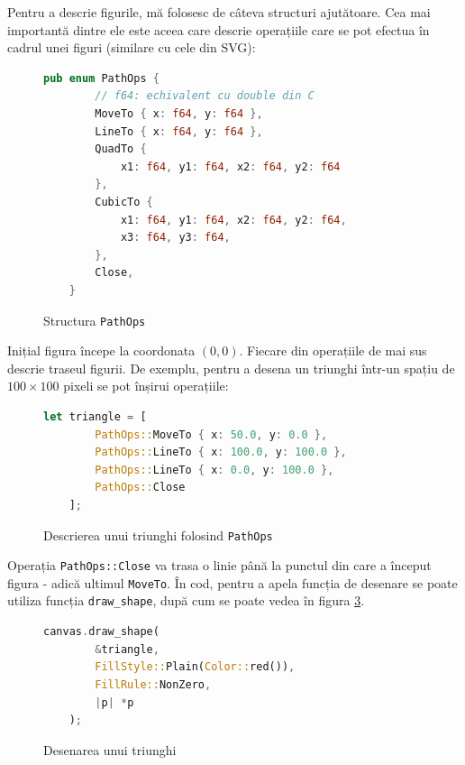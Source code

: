 \documentclass[a4paper, 12pt]{report}
\begin{document}
Pentru a descrie figurile, mă folosesc de câteva structuri ajutătoare. Cea mai importantă dintre ele este aceea care descrie
operațiile care se pot efectua în cadrul unei figuri (similare cu cele din SVG):

\begin{figure}[ht]
    \centering
    \begin{lstlisting}[language=Rust]
    pub enum PathOps {
        // f64: echivalent cu double din C
        MoveTo { x: f64, y: f64 },
        LineTo { x: f64, y: f64 },
        QuadTo {
            x1: f64, y1: f64, x2: f64, y2: f64
        },
        CubicTo {
            x1: f64, y1: f64, x2: f64, y2: f64,
            x3: f64, y3: f64,
        },
        Close,
    }
    \end{lstlisting}
    \caption{Structura \texttt{PathOps}}
    \label{fig-enum-pathops}
\end{figure}

Inițial figura începe la coordonata \((0, 0)\). Fiecare din operațiile de mai sus descrie traseul figurii. De exemplu, pentru a desena
un triunghi într-un spațiu de \(100 \times 100\) pixeli se pot înșirui operațiile:

\begin{figure}[ht]
    \centering
    \begin{lstlisting}[language=Rust]
    let triangle = [
        PathOps::MoveTo { x: 50.0, y: 0.0 },
        PathOps::LineTo { x: 100.0, y: 100.0 },
        PathOps::LineTo { x: 0.0, y: 100.0 },
        PathOps::Close
    ];
    \end{lstlisting}
    \caption{Descrierea unui triunghi folosind \texttt{PathOps}}
    \label{fig-descrierea-unui-triunghi}
\end{figure}

Operația \texttt{PathOps::Close} va trasa o linie până la punctul din care a început figura - adică ultimul \texttt{MoveTo}. În cod,
pentru a apela funcția de desenare se poate utiliza funcția \texttt{draw\_shape}, după cum se poate vedea în figura \ref{fig-desenarea-unui-triunghi}.

\begin{figure}[ht]
    \centering
    \begin{lstlisting}[language=Rust]
    canvas.draw_shape(
        &triangle,
        FillStyle::Plain(Color::red()),
        FillRule::NonZero,
        |p| *p
    );
    \end{lstlisting}
    \caption{Desenarea unui triunghi}
    \label{fig-desenarea-unui-triunghi}
\end{figure}
\end{document}
